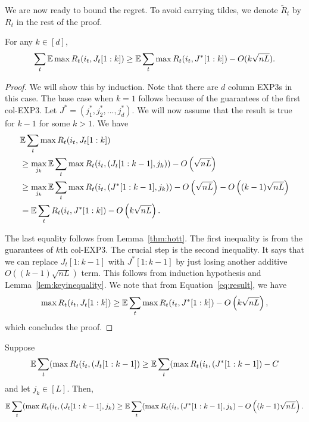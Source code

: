 We are now ready to bound the regret. %
To avoid carrying tildes, we denote $\tilde{R}_t$ by $R_t$ in the rest of the proof.
\begin{lemma}
For any $k \in [d]$,
$$ \sum_t \mathbb{E} \max R_t(i_t,J_t[1:k]) \geq  \mathbb{E} \sum_t \max R_t(i_t,J^*[1:k]) - O(k\sqrt{nL}).$$ 
\end{lemma}
\begin{proof}
We will show this by induction. Note that there are $d$ column EXP3s in this case. The base case when $k=1$ follows because of the guarantees of the first col-EXP3.
Let $J^* = (j_1^*,j_2^*,...,j_d^*).$   We will now assume that the result is true for $k-1$ for some $k>1.$
We have 
\begin{align}
& \mathbb{E}  \sum_t  \max R_t(i_t,J_t[1:k])   \\
&\geq \max_{j_k} \mathbb{E} \sum_t   \max R_t(i_t,(J_t[1:k-1],j_k))  - O\left(\sqrt{nL}\right) \\
&\geq \max_{j_k} \mathbb{E} \sum_t   \max R_t(i_t,(J^*[1:k-1],j_k))   - O\left( \sqrt{nL} \right) - O\left( (k-1)\sqrt{nL} \right)   \\
\label{eq:result}
& =  \mathbb{E} \sum_t   R_t(i_t,J^*[1:k])  - O\left( k\sqrt{nL} \right).
\end{align}

The last equality follows from Lemma~\ref{thm:hott}. %
The first inequality is from the guarantees of $k$th col-EXP3.  The crucial step is  the second inequality. It says that we can replace $J_t[1:k-1]$ with $J^*[1:k-1]$ by just losing another additive $O\left( (k-1) \sqrt{nL} \right)$ term. This follows from induction hypothesis and Lemma~\ref{lem:keyinequality}. We note that from Equation~\ref{eq:result}, we have
$$ \max R_t(i_t,J_t[1:k]) \geq  \mathbb{E} \sum_t \max R_t(i_t,J^*[1:k]) - O\left( k \sqrt{nL} \right),$$
which concludes the proof.
\end{proof}
\begin{lemma}
\label{lem:keyinequality}
Suppose
 $$ \mathbb{E} \sum_t (\max R_t(i_t,(J_t[1:k-1]) \geq  \mathbb{E} \sum_t (\max R_t(i_t,(J^*[1:k-1])  - C$$
  and let $j_k \in [L].$ Then,
$$ \mathbb{E} \sum_t (\max R_t(i_t,(J_t[1:k-1],j_k) \geq \mathbb{E} \sum_t (\max R_t(i_t,(J^*[1:k-1],j_k) - O\left((k-1) \sqrt{nL} \right).$$
\end{lemma}

